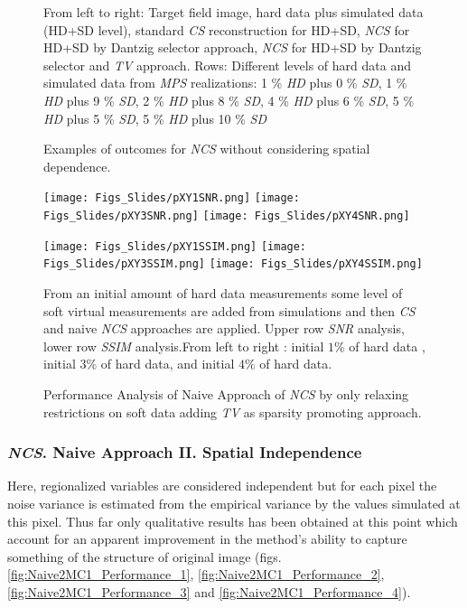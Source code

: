 \begin{figure}
		\caption{Examples of outcomes for \emph{NCS} without considering spatial dependence.}
		\scriptsize{From left to right: Target field image, hard data plus simulated data (HD+SD level), standard \emph{CS} reconstruction for HD+SD, \emph{NCS} for HD+SD by Dantzig selector approach, \emph{NCS} for HD+SD by Dantzig selector and \emph{TV} approach. Rows: Different levels of hard data and simulated data from \emph{MPS} realizations: 1 \% \emph{HD} plus 0 \% \emph{SD}, 1 \% \emph{HD} plus 9 \% \emph{SD}, 2 \% \emph{HD} plus 8 \% \emph{SD}, 4
	\% \emph{HD} plus 6 \% \emph{SD}, 5
	\% \emph{HD} plus 5 \% \emph{SD}, 5
	\% \emph{HD} plus 10 \% \emph{SD}
		}
		\label{fig:Naive1MC1}
		\end{figure}


		\begin{figure}[H]
		\centering
		\texttt{[image: Figs\_Slides/pXY1SNR.png]}
		\texttt{[image: Figs\_Slides/pXY3SNR.png]}
		\texttt{[image: Figs\_Slides/pXY4SNR.png]}

		\texttt{[image: Figs\_Slides/pXY1SSIM.png]}
		\texttt{[image: Figs\_Slides/pXY3SSIM.png]}
		\texttt{[image: Figs\_Slides/pXY4SSIM.png]}

		\caption[Performance Analysis of Naive Approach of \emph{NCS} adding \emph{TV}.]{Performance Analysis of Naive Approach of \emph{NCS} by only relaxing restrictions on soft data adding \emph{TV} as sparsity promoting approach.}
		\scriptsize{From an initial amount of hard data measurements some level of soft virtual measurements are added from simulations and then \emph{CS} and naive \emph{NCS} approaches are applied. Upper row \emph{SNR} analysis, lower row \emph{SSIM} analysis.From left to right  : initial $1 \%$ of hard data , initial $3 \%$ of hard data, and initial $4 \%$ of hard data.}
		\label{fig:Naive1MC1_Performance}	
	\end{figure}



\subsubsection{\emph{NCS}. Naive Approach II. Spatial Independence }

Here, regionalized variables are considered independent but for each pixel the noise variance is estimated from the empirical variance by the values simulated at this pixel. Thus far only qualitative results has been obtained at this point which account for an apparent improvement in the method's ability to capture something of the structure of original image (figs. \ref{fig:Naive2MC1_Performance_1}, \ref{fig:Naive2MC1_Performance_2}, \ref{fig:Naive2MC1_Performance_3} and \ref{fig:Naive2MC1_Performance_4}).

